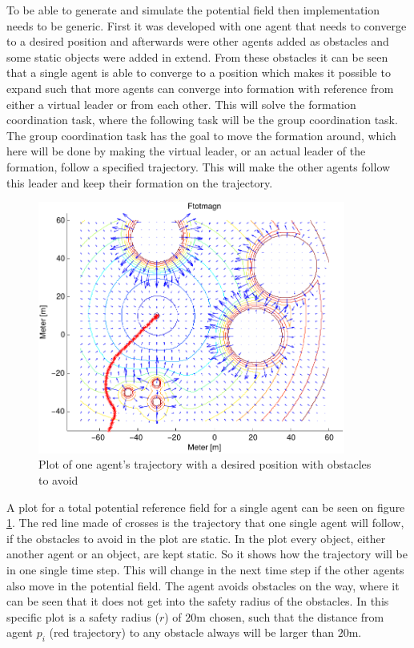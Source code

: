 To be able to generate and simulate the potential field then
implementation needs to be generic. First it was developed with one
agent that needs to converge to a desired position and afterwards were
other agents added as obstacles and some static objects were added in
extend. From these obstacles it can be seen that a single agent is
able to converge to a position which makes it possible to expand such
that more agents can converge into formation with reference from
either a virtual leader or from each other. This will solve the
formation coordination task, where the following task will be the
group coordination task. The group coordination task has the goal to
move the formation around, which here will be done by making the
virtual leader, or an actual leader of the formation, follow a
specified trajectory. This will make the other agents follow this
leader and keep their formation on the trajectory.

\begin{figure}[htbp]
  \includegraphics[width=0.9\textwidth]{fig/ftotmagnfigpdf1}
  \caption{Plot of one agent's trajectory with a desired position with obstacles to avoid}
  \label{fig:potfieldagenti}
\end{figure}

A plot for a total potential reference field for a single agent can be
seen on figure \ref{fig:potfieldagenti}. The red line made of crosses
is the trajectory that one single agent will follow, if the obstacles
to avoid in the plot are static. In the plot every object, either
another agent or an object, are kept static. So it shows how the
trajectory will be in one single time step. This will change in the
next time step if the other agents also move in the potential field.
The agent avoids obstacles on the way, where it can be seen that it
does not get into the safety radius of the obstacles. In this specific
plot is a safety radius ($r$) of $20$m chosen, such that the distance
from agent $p_i$ (red trajectory) to any obstacle always will be
larger than $20$m.

